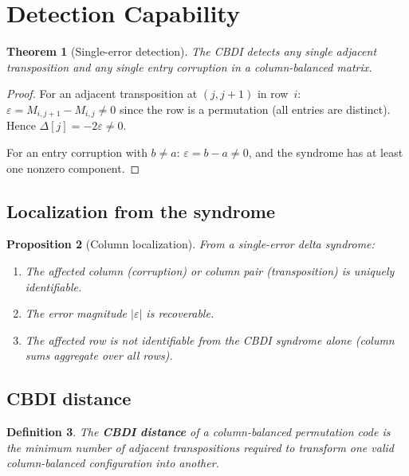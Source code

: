 \documentclass[11pt]{article}
\newtheorem{theorem}{Theorem}
\newtheorem{proposition}[theorem]{Proposition}
\newtheorem{definition}[theorem]{Definition}
\begin{document}
\section{Detection Capability}
\label{sec:detection}

\begin{theorem}[Single-error detection]\label{thm:detection}
The CBDI detects any single adjacent transposition and any single entry corruption in a column-balanced matrix.
\end{theorem}

\begin{proof}
For an adjacent transposition at $(j, j+1)$ in row~$i$: $\varepsilon = M_{i,j+1} - M_{i,j} \neq 0$ since the row is a permutation (all entries are distinct). Hence $\Delta[j] = -2\varepsilon \neq 0$.

For an entry corruption with $b \neq a$: $\varepsilon = b - a \neq 0$, and the syndrome has at least one nonzero component.
\end{proof}

\subsection{Localization from the syndrome}

\begin{proposition}[Column localization]
From a single-error delta syndrome:
\begin{enumerate}
\item The affected column (corruption) or column pair (transposition) is uniquely identifiable.
\item The error magnitude $|\varepsilon|$ is recoverable.
\item The affected \emph{row} is not identifiable from the CBDI syndrome alone (column sums aggregate over all rows).
\end{enumerate}
\end{proposition}

\subsection{CBDI distance}

\begin{definition}
The \textbf{CBDI distance} of a column-balanced permutation code is the minimum number of adjacent transpositions required to transform one valid column-balanced configuration into another.
\end{definition}
\end{document}
